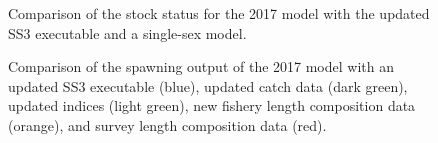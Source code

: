 \documentclass[
]{scrartcl}
\begin{document}
\begin{figure}


\caption{\label{fig-ss3exe_2}Comparison of the stock status for the 2017
model with the updated SS3 executable and a single-sex model.}

\end{figure}%

\clearpage

\begin{figure}


\caption{\label{fig-newdata_1}Comparison of the spawning output of the
2017 model with an updated SS3 executable (blue), updated catch data
(dark green), updated indices (light green), new fishery length
composition data (orange), and survey length composition data (red).}

\end{figure}%
\end{document}
